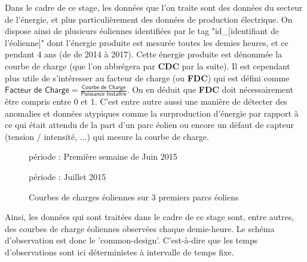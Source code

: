 
Dans le cadre de ce stage, les données que l'on traite sont des données du secteur de l'énergie, et plus particulièrement des données de production électrique. On dispose ainsi de plusieurs éoliennes identifiées par le tag "id\_[identifiant de l'éolienne]" dont l'énergie produite est mesurée toutes les demies heures, et ce pendant 4 ans (de de 2014 à 2017).
Cette énergie produite est dénommée la courbe de charge (que l'on abbrégera par \textbf{CDC} par la suite). Il est cependant plus utile de s'intéresser au facteur de charge (ou \textbf{FDC}) qui est défini comme
$\displaystyle\textsf{Facteur de Charge} = \frac{\textsf{Courbe de Charge}}{\textsf{Puissance Installée}}$.
On en déduit que \textbf{FDC} doit nécessairement être compris entre 0 et 1. C'est entre autre aussi une manière de détecter des anomalies et données atypiques comme la surproduction d'énergie par rapport à ce qui était attendu de la part d'un parc éolien ou encore un défaut de capteur (tension / intensité, ...) qui mesure la courbe de charge.


\begin{figure}[H]
	\centering
	période : Première semaine de Juin 2015


	période : Juillet 2015

	\caption{Courbes de charges éoliennes sur 3 premiers parcs éoliens}
	\label{fig:courbes_de_charge}
\end{figure}

Ainsi, les données qui sont traitées dans le cadre de ce stage sont, entre autres, des courbes de charge éoliennes observées chaque demie-heure. Le schéma d’observation est donc le 'common-design'. C'est-à-dire que les temps d'observations sont ici déterministes à intervalle de temps fixe.
